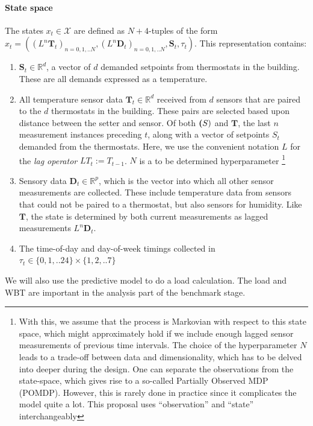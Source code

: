 \documentclass{article}
\theoremstyle{definition}
\theoremstyle{remark}
\begin{document}
\paragraph{State space}
The states $x_t\in \mathcal{X}$ are defined as $N+4$-tuples of the form ${x_t = ((L^n\textbf{T}_t)_{n=0,1,..N}, (L^n\textbf{D}_t)_{n=0,1,..N}, \textbf{S}_t, \tau_t)}$. This representation contains:
\begin{enumerate}
    \item $\textbf{S}_t \in \mathbb{R}^d$, a vector of $d$ demanded setpoints from thermostats in the building. These are all demands expressed as a temperature.
    \item All temperature sensor data $\textbf{T}_t \in \mathbb{R}^d$ received from $d$ sensors that are paired to the $d$ thermostats in the building. These pairs are selected based upon distance between the setter and sensor. Of both $\textbf(S)$ and $\textbf{T}$, the last $n$ measurement instances preceding $t$, along with a vector of setpoints $\textit{S}_t$ demanded from the thermostats. Here, we use the convenient notation $L$ for the \textit{lag operator} $LT_t := T_{t-1}$. $N$ is a to be determined hyperparameter \footnote{With this, we assume that the process is Markovian with respect to this state space, which might approximately hold if we include enough lagged sensor measurements of previous time intervals. The choice of the hyperparameter $N$ leads to a trade-off between data and dimensionality, which has to be delved into deeper during the design. One can separate the observations from the state-space, which gives rise to a so-called Partially Observed MDP (POMDP). However, this is rarely done in practice since it complicates the model quite a lot. This proposal uses ``observation'' and ``state'' interchangeably}
    \item Sensory data $\textbf{D}_t \in \mathbb{R}^p$, which is the vector into which all other sensor measurements are collected. These include temperature data from sensors that could not be paired to a thermostat, but also sensors for humidity. Like $\mathbf{T}$, the state is determined by both current measurements as lagged measurements $L^n\mathbf{D}_t$.
    \item The time-of-day and day-of-week timings collected in $\tau_t\in \{0,1,..24\}\times \{1,2,..7\}$
\end{enumerate}
We will also use the predictive model to do a load calculation. The load and WBT are important in the analysis part of the benchmark stage.
\end{document}
